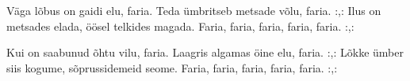 V\"aga l\~obus on gaidi elu, faria.
Teda \"umbritseb metsade v\~olu, faria.
:,: Ilus on metsades elada, \"o\"osel telkides magada.
Faria, faria, faria, faria, faria. :,:

Kui on saabunud \~ohtu vilu, faria.
Laagris algamas \"oine elu, faria.
:,: L\~okke \"umber siis kogume, s\~oprussidemeid seome.
Faria, faria, faria, faria, faria. :,:
